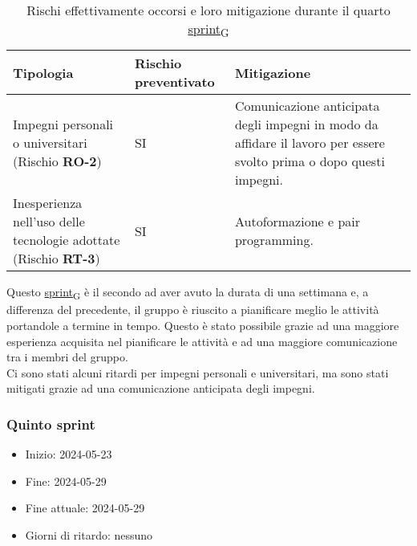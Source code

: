\begin{table}[!h]
	\centering
	\begin{tabular}{ | p{6cm} | p{2.5cm} | p{7.5cm} | }
		\hline
		\textbf{Tipologia}                                                      & \textbf{Rischio preventivato} & \textbf{Mitigazione}                                                                                                \\
		\hline
		Impegni personali o universitari (Rischio \textbf{RO-2})                & SI                            & Comunicazione anticipata degli impegni in modo da affidare il lavoro per essere svolto prima o dopo questi impegni. \\
		\hline
		Inesperienza nell'uso delle tecnologie adottate (Rischio \textbf{RT-3}) & SI                            & Autoformazione e pair programming.                                                                                  \\
		\hline
	\end{tabular}
	\caption{Rischi effettivamente occorsi e loro mitigazione durante il quarto \href{https://7last.github.io/docs/rtb/documentazione-interna/glossario\#sprint}{sprint\textsubscript{G}}}
	
\end{table}
\newpage
{}
Questo \href{https://7last.github.io/docs/rtb/documentazione-interna/glossario\#sprint}{sprint\textsubscript{G}} è il secondo ad aver avuto la durata di una settimana e, a differenza del precedente, il gruppo è riuscito
a pianificare meglio le attività portandole a termine in tempo.
Questo è stato possibile grazie ad una maggiore esperienza acquisita nel pianificare le attività e ad una maggiore
comunicazione tra i membri del gruppo.\\
Ci sono stati alcuni ritardi per impegni personali e universitari, ma sono stati mitigati grazie ad una comunicazione
anticipata degli impegni.



\subsubsection{Quinto sprint} 
\begin{itemize}
    \item Inizio: 2024-05-23
    \item Fine: 2024-05-29 
    \item Fine attuale: 2024-05-29
	\item Giorni di ritardo: nessuno
\end{itemize}

